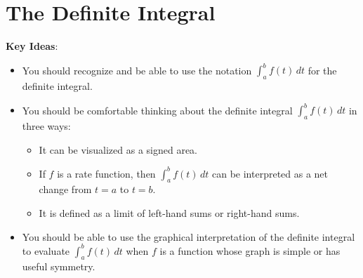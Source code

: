 \documentclass[main]{subfiles}
\begin{document}
\ifSubfilesClassLoaded{%
  \chaptermark{\chapterfive}
}{}

\section{The Definite Integral} \label{ws5-2}

\begin{problemonly}
    \begin{framed}

\textbf{Key Ideas}:

\begin{itemize}[topsep=0pt,partopsep=0pt,parsep=8pt,itemsep=0pt]

\item You should recognize and be able to use the notation
  $\displaystyle \int_a^b f(t)\,dt$ for the definite integral. 

\item You should be comfortable thinking about the definite integral
  $\displaystyle \int_a^b f(t)\,dt$ in three ways:
  \begin{itemize}[topsep=0pt]
  \item It can be visualized as a signed area.
  \item If $f$ is a rate function, then $\displaystyle \int_a^b
    f(t)\,dt$ can be interpreted as a net change from $t=a$ to $t=b$.
  \item It is defined as a limit of left-hand sums or right-hand sums.
  \end{itemize}

\item You should be able to use the graphical interpretation of the
  definite integral to evaluate $\displaystyle \int_a^b f(t)\,dt$ when
  $f$ is a function whose graph is simple or has useful symmetry.

\end{itemize}
\end{framed}
\end{problemonly}
\end{document}
